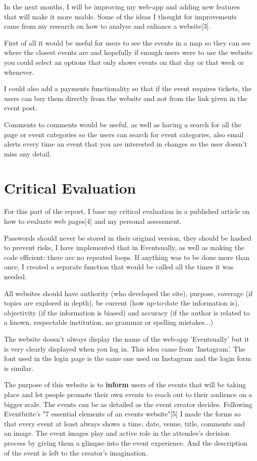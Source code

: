 \documentclass[10pt, a4paper]{article}
\begin{document}
In the next months, I will be improving my web-app and adding new features that will make it more usable. Some of the ideas I thought for improvements came from my research on how to analyse and enhance a website[3].

First of all it would be useful for users to see the events in a map so they can see where the closest events are and hopefully if enough users were to use the website you could select an options that only shows events on that day or that week or whenever.

I could also add a payments functionality so that if the event requires tickets, the users can buy them directly from the website and not from the link given in the event post.

Comments to comments would be useful, as well as having a search for all the page or event categories so the users can search for event categories, also email alerts every time an event that you are interested in changes so the user doesn't miss any detail.

    \section{Critical Evaluation}
For this part of the report, I base my critical evaluation in a published article on how to evaluate web pages[4] and my personal assessment.

Passwords should never be stored in their original version, they should be hashed to prevent risks, I have implemented that in Eventsually, as well as making the code efficient: there are no repeated loops. If anything was to be done more than once, I created a separate function that would be called all the times it was needed.

All websites should have authority (who developed the site), purpose, coverage (if topics are explored in depth), be current (how up-to-date the information is), objectivity (if the information is biased) and accuracy (if the author is related to a known, respectable institution, no grammar or spelling mistakes...)

The website doesn't always display the name of the web-app 'Eventsually' but it is very clearly displayed when you log in. This idea came from 'Instagram'. The font used in the login page is the same one used on Instagram and the login form is similar.

The purpose of this website is to \textbf{inform} users of the events that will be taking place and let people promote their own events to reach out to their audience on a bigger scale. The events can be as detailed as the event creator decides. Following Eventbrite's "7 essential elements of an events website"[5] I made the forms so that every event at least always shows a time, date, venue, title, comments and an image. The event images play and active role in the attendee's decision process by giving them a glimpse into the event experience. And the description of the event is left to the creator's imagination.
\end{document}
